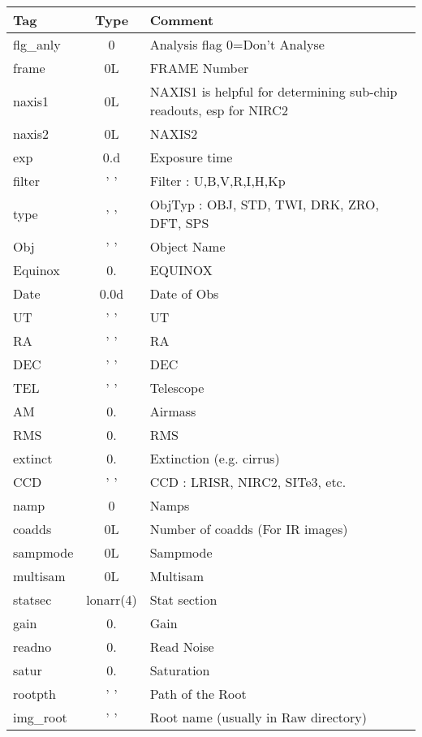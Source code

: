 \documentclass[11pt,letterpaper,dvips]{article}
\begin{document}
\begin{enumerate}
\begin{Aenumerate}
	{\small
	\begin{tabular}{lcl}
	  \hline
	  Tag & Type & Comment \\
	  \hline
          flg\_anly & 0 &      Analysis flag 0=Don't Analyse \\
          frame & 0L &         FRAME Number \\
          naxis1 &  0L &       NAXIS1 is helpful for determining sub-chip readouts, esp for NIRC2 \\
          naxis2 & 0L       &  NAXIS2 \\
          exp & 0.d &          Exposure time \\
          filter & ' ' &       Filter : U,B,V,R,I,H,Kp \\
          type & ' ' &         ObjTyp : OBJ, STD, TWI, DRK, ZRO, DFT, SPS \\
          Obj & ' ' &          Object Name \\
          Equinox & 0. &       EQUINOX \\
          Date & 0.0d &        Date of Obs \\
          UT & ' ' &           UT \\
          RA & ' ' &           RA \\
          DEC & ' ' &          DEC \\
          TEL & ' ' &          Telescope \\
          AM &   0. &          Airmass \\
          RMS &   0. &         RMS \\
          extinct &   0. &     Extinction (e.g. cirrus) \\
          CCD & ' ' &          CCD : LRISR, NIRC2, SITe3, etc.\\
          namp & 0 &           Namps \\
          coadds & 0L &        Number of coadds (For IR images) \\
          sampmode & 0L &      Sampmode \\
          multisam & 0L &      Multisam \\
          statsec & lonarr(4) &    Stat section \\
          gain & 0. &          Gain \\
          readno & 0. &        Read Noise \\
          satur  & 0. &        Saturation \\
          rootpth & ' ' &      Path of the Root \\
          img\_root & ' ' &    Root name (usually in Raw directory) \\

\end{tabular}}
\end{Aenumerate}
\end{enumerate}
\end{document}
